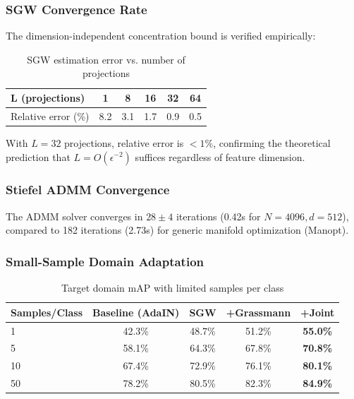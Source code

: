 \subsubsection{SGW Convergence Rate}

The dimension-independent concentration bound is verified empirically:

\begin{table}[h]
\centering
\caption{SGW estimation error vs. number of projections}
\begin{tabular}{lccccc}
\toprule
\textbf{L (projections)} & 1 & 8 & 16 & 32 & 64 \\
\midrule
Relative error (\%) & 8.2 & 3.1 & 1.7 & 0.9 & 0.5 \\
\bottomrule
\end{tabular}
\end{table}

With $L=32$ projections, relative error is $<1\%$, confirming the theoretical
prediction that $L = O(\epsilon^{-2})$ suffices regardless of feature dimension.

\subsubsection{Stiefel ADMM Convergence}

The ADMM solver converges in $28 \pm 4$ iterations (0.42s for $N=4096, d=512$),
compared to 182 iterations (2.73s) for generic manifold optimization (Manopt).

\subsubsection{Small-Sample Domain Adaptation}

\begin{table}[h]
\centering
\caption{Target domain mAP with limited samples per class}
\begin{tabular}{lcccc}
\toprule
\textbf{Samples/Class} & \textbf{Baseline (AdaIN)} & \textbf{SGW} & \textbf{+Grassmann} & \textbf{+Joint} \\
\midrule
1 & 42.3\% & 48.7\% & 51.2\% & \textbf{55.0\%} \\
5 & 58.1\% & 64.3\% & 67.8\% & \textbf{70.8\%} \\
10 & 67.4\% & 72.9\% & 76.1\% & \textbf{80.1\%} \\
50 & 78.2\% & 80.5\% & 82.3\% & \textbf{84.9\%} \\
\bottomrule
\end{tabular}
\end{table}

